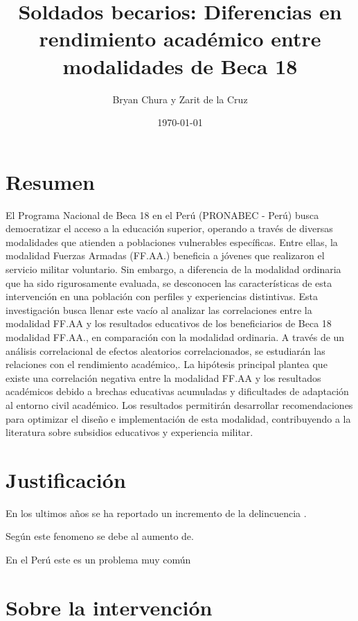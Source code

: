 \documentclass[12pt, a4paper]{article} %
\title{Soldados becarios: Diferencias en rendimiento académico entre modalidades de Beca 18}
\author{Bryan Chura y Zarit de la Cruz}
\date{\today}
\begin{document}
\maketitle

\section{Resumen}

El Programa Nacional de Beca 18 en el Perú (PRONABEC - Perú) busca democratizar el acceso a la educación superior, operando a través de diversas modalidades que atienden a poblaciones vulnerables específicas. Entre ellas, la modalidad Fuerzas Armadas (FF.AA.) beneficia a jóvenes que realizaron el servicio militar voluntario. Sin embargo, a diferencia de la modalidad ordinaria que ha sido rigurosamente evaluada, se desconocen las características de esta intervención en una población con perfiles y experiencias distintivas. Esta investigación busca llenar este vacío al analizar las correlaciones entre la modalidad FF.AA y los resultados educativos  de los beneficiarios de Beca 18 modalidad FF.AA., en comparación con la modalidad ordinaria. A través de un análisis correlacional de efectos aleatorios correlacionados, se estudiarán las relaciones con el rendimiento académico,. La hipótesis principal plantea que existe una correlación negativa entre la modalidad FF.AA y los resultados académicos debido a brechas educativas acumuladas y dificultades de adaptación al entorno civil académico. Los resultados permitirán desarrollar recomendaciones para optimizar el diseño e implementación de esta modalidad, contribuyendo a la literatura sobre subsidios educativos y experiencia militar.

\section{Justificación}

En los ultimos años se ha reportado un incremento de la delincuencia \citep{cattaneo_regression_2022}. 

Según \citet{walkey_novel_2020} este fenomeno se debe al aumento de.

En el Perú este es un problema muy común \citep{cochran_combination_1954, lee_regression_2010,larsen_fuzzy_2023}



\section{Sobre la intervención}
\end{document}
